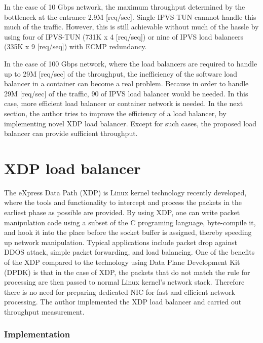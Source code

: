 In the case of 10 Gbps network, the maximum throughput determined by the bottleneck at the entrance  2.9M [req/sec].
Single IPVS-TUN cannnot handle this much of the traffic.
However, this is still  achievable without much of the hassle by using four of IPVS-TUN (731K x 4 [req/seq]) or nine of IPVS load balancers (335K x 9 [req/seq]) with ECMP redundancy.

In the case of 100 Gbps network, where the load balancers are required to handle up to 29M [req/sec] of the throughput, the inefficiency of the software load balancer in a container can become a real problem.
Because in order to handle 29M [req/sec] of the traffic, 90 of IPVS load balancer would be needed.
In this case, more efficient load balancer or container network is needed.
In the next section, the author tries to improve the efficiency of a load balancer, by implementing novel XDP load balancer.
Except for such cases, the proposed load balancer can provide sufficient throughput.

\FloatBarrier

\section{XDP load balancer}

The eXpress Data Path (XDP) \cite{hoiland2018express} is Linux kernel technology recently developed, where the tools and functionality to intercept and process the packets in the earliest phase as possible are provided.
By using XDP, one can write packet manipulation code using a subset of the C programing language, byte-compile it, and hook it into the place before the socket buffer is assigned, thereby speeding up network manipulation.
Typical applications include packet drop against DDOS attack, simple packet forwarding, and load balancing.
One of the benefits of the XDP compared to the technology using Data Plane Development Kit (DPDK) \cite{dpdkorg} is that in the case of XDP, the packets that do not match the rule for processing are then passed to normal Linux kernel's network stack.
Therefore there is no need for preparing dedicated NIC for fast and efficient network processing.
The author implemented the XDP load balancer and carried out throughput measurement.

\subsubsection{Implementation}

